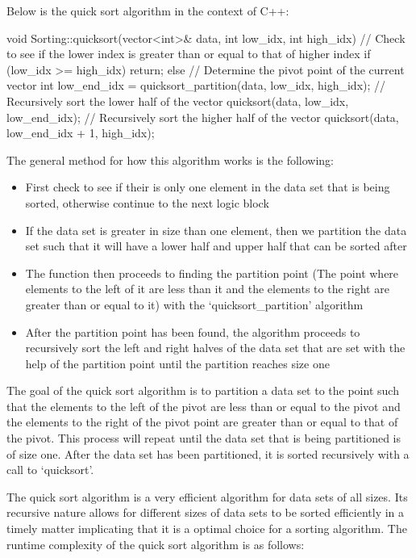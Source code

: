 \begin{highlight}
Below is the quick sort algorithm in the context of C++:

\begin{code}
void Sorting::quicksort(vector<int>& data, int low_idx, int high_idx){
    // Check to see if the lower index is greater than or equal to that of higher index
    if (low_idx >= high_idx) {
        return;
    }
    else {
        // Determine the pivot point of the current vector
        int low_end_idx = quicksort_partition(data, low_idx, high_idx);
        // Recursively sort the lower half of the vector
        quicksort(data, low_idx, low_end_idx);
        // Recursively sort the higher half of the vector
        quicksort(data, low_end_idx + 1, high_idx);
    }
}
\end{code}

The general method for how this algorithm works is the following:

\begin{itemize}
    \item First check to see if their is only one element in the data set that is being sorted, otherwise continue to the next logic block
    \item If the data set is greater in size than one element, then we partition the data set such that it will have a lower half and upper half that can be sorted after
    \item The function then proceeds to finding the partition point (The point where elements to the left of it are less than it and the elements to the right are greater than or equal to it) with the `quicksort\_partition' algorithm
    \item After the partition point has been found, the algorithm proceeds to recursively sort the left and right halves of the data set that are set with the help of the partition point until the partition reaches size one
\end{itemize}

\noindent The goal of the quick sort algorithm is to partition a data set to the point such that the elements to the left of the pivot are less than or equal to the pivot and the elements to the right of the pivot point are greater than or equal to that of the pivot. This process will repeat until the data set that is being partitioned is of size one.
After the data set has been partitioned, it is sorted recursively with a call to `quicksort'.

The quick sort algorithm is a very efficient algorithm for data sets of all sizes. Its recursive nature allows for different sizes of data sets to be sorted efficiently in a timely matter implicating that it is a optimal choice for a sorting algorithm. The runtime complexity of the quick sort algorithm is as follows:


\end{highlight}
